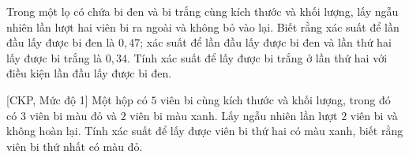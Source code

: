 \begin{bt}%
Trong một lọ có chứa bi đen và bi trắng cùng kích thước và khối lượng, lấy ngẫu nhiên lần lượt hai viên bi ra ngoài và không bỏ vào lại. Biết rằng xác suất để lần đầu lấy được bi đen là $0{,}47$; xác suất để lần đầu lấy được bi đen và lần thứ hai lấy được bi trắng là $0{,34}$. Tính xác suất để lấy được bi trắng ở lần thứ hai với điều kiện lần đầu lấy được bi đen. 
\end{bt}

\begin{bt}%
[CKP, Mức độ 1]%
Một hộp có $5$ viên bi cùng kích thước và khối lượng, trong đó có $3$ viên bi màu đỏ và $2$ viên bi màu xanh. Lấy ngẫu nhiên lần lượt $2$ viên bi và không hoàn lại. Tính xác suất để lấy được viên bi thứ hai có màu xanh, biết rằng viên bi thứ nhất có màu đỏ.
\end{bt}

